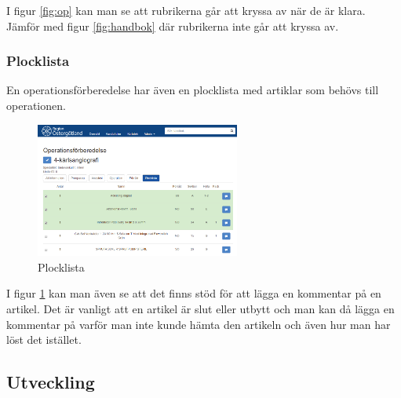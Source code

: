 I figur \ref{fig:op} kan man se att rubrikerna går att kryssa av när de är klara. Jämför med figur \ref{fig:handbok} där rubrikerna inte går att kryssa av.

\subsubsection{Plocklista}
En operationsförberedelse har även en plocklista med artiklar som behövs till operationen.

\begin{figure}
  \centering
  \includegraphics[width=0.6\textwidth]{images/site/plocklista}
  \caption{Plocklista}
  \label{fig:plocklista}
\end{figure}

I figur \ref{fig:plocklista} kan man även se att det finns stöd för att lägga en kommentar på en artikel.
Det är vanligt att en artikel är slut eller utbytt och man kan då lägga en kommentar på varför man inte kunde hämta den artikeln och även hur man har löst det istället.

\subsection{Utveckling}




